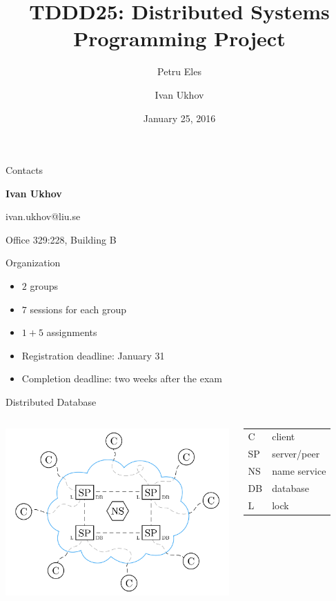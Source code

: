 \documentclass[compress,xcolor=table]{beamer}
\title{%
  TDDD25: Distributed Systems\\%
  \vspace{0.1em}%
  Programming Project%
}
\author{Petru Eles \and Ivan Ukhov}
\date{January 25, 2016}
\institute[Link\"oping University]{
  Computer and Information Science\\
  Link\"oping University
}
\begin{document}
\frame[plain]{\titlepage}

\begin{frame}{Contacts}
\begin{center}
  \textbf{Ivan Ukhov}
  \vspace{1em}

  ivan.ukhov@liu.se

  Office 329:228, Building B
\end{center}
\end{frame}

\begin{frame}{Organization}
\begin{itemize}
  \item $2$ groups
  \item $7$ sessions for each group
  \item $1 + 5$ assignments
  \item Registration deadline: January 31
  \item Completion deadline: two weeks after the exam
\end{itemize}
\end{frame}

\begin{frame}{Distributed Database}
\begin{columns}
  \column{7cm}
  \centering
  \includegraphics[scale=0.14,page=1]{include/assets/distributed-database}
  \column{3cm}
  \begin{tabular}{l @{ --- } l}
    \alert{C}  & client \\
    \alert{SP} & server/peer \\
    \alert{NS} & name service \\
    \alert{DB} & database \\
    \alert{L}  & lock
  \end{tabular}
\end{columns}
\end{frame}
\end{document}
